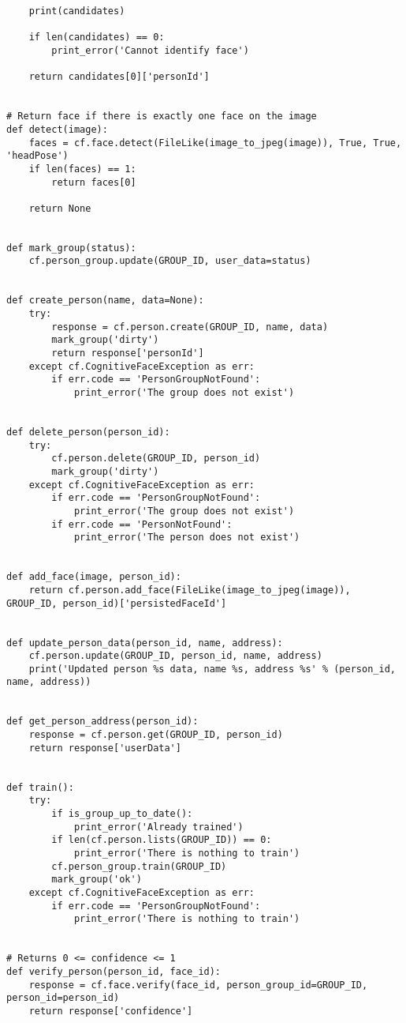 \begin{verbatim}
    print(candidates)

    if len(candidates) == 0:
        print_error('Cannot identify face')

    return candidates[0]['personId']


# Return face if there is exactly one face on the image
def detect(image):
    faces = cf.face.detect(FileLike(image_to_jpeg(image)), True, True, 'headPose')
    if len(faces) == 1:
        return faces[0]

    return None


def mark_group(status):
    cf.person_group.update(GROUP_ID, user_data=status)


def create_person(name, data=None):
    try:
        response = cf.person.create(GROUP_ID, name, data)
        mark_group('dirty')
        return response['personId']
    except cf.CognitiveFaceException as err:
        if err.code == 'PersonGroupNotFound':
            print_error('The group does not exist')


def delete_person(person_id):
    try:
        cf.person.delete(GROUP_ID, person_id)
        mark_group('dirty')
    except cf.CognitiveFaceException as err:
        if err.code == 'PersonGroupNotFound':
            print_error('The group does not exist')
        if err.code == 'PersonNotFound':
            print_error('The person does not exist')


def add_face(image, person_id):
    return cf.person.add_face(FileLike(image_to_jpeg(image)), GROUP_ID, person_id)['persistedFaceId']


def update_person_data(person_id, name, address):
    cf.person.update(GROUP_ID, person_id, name, address)
    print('Updated person %s data, name %s, address %s' % (person_id, name, address))


def get_person_address(person_id):
    response = cf.person.get(GROUP_ID, person_id)
    return response['userData']


def train():
    try:
        if is_group_up_to_date():
            print_error('Already trained')
        if len(cf.person.lists(GROUP_ID)) == 0:
            print_error('There is nothing to train')
        cf.person_group.train(GROUP_ID)
        mark_group('ok')
    except cf.CognitiveFaceException as err:
        if err.code == 'PersonGroupNotFound':
            print_error('There is nothing to train')


# Returns 0 <= confidence <= 1
def verify_person(person_id, face_id):
    response = cf.face.verify(face_id, person_group_id=GROUP_ID, person_id=person_id)
    return response['confidence']
\end{verbatim}

